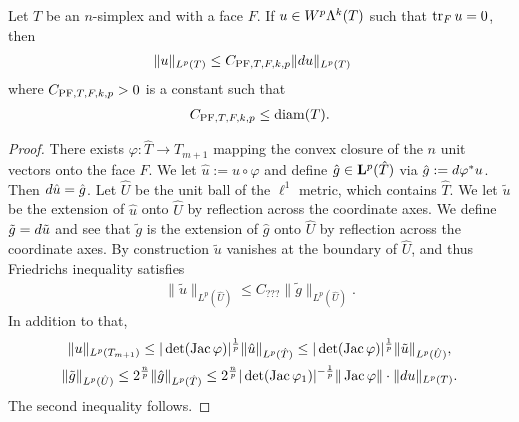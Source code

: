 \documentclass[12pt,a4paper]{article}
\begin{document}
\begin{lemma}\label{lemma:mixedbconsimplex:exteriorderivative}
    Let $T$ be an $n$-simplex and with a face $F$. 
    If $u \in W^{p}\Lambda^{k}(T)$ such that $\operatorname{tr}_{F} u = 0$, then 
    \begin{align*}
        \| u \|_{L^{p}(T)}
        &
        \leq 
        C_{{\rm PF},T,F,k,p} \| d u \|_{L^{p}(T)}
    \end{align*}
    where $C_{{\rm PF},T,F,k,p} > 0$ is a constant such that 
    \begin{align*}
        C_{{\rm PF},T,F,k,p}
        \leq 
        {\operatorname{diam}}(T)
        .
    \end{align*}
\end{lemma}
\begin{proof}
    There exists $\varphi : \hat T \rightarrow T_{m+1}$ mapping the convex closure of the $n$ unit vectors onto the face $F$.
    We let $\hat u := u \circ \varphi$ and define $\hat g \in {\mathbf L}^p(\hat T)$ via $\hat g := d \varphi^{\ast} u$. 
    Then $d \hat u = \hat g$. 
    Let $\hat U$ be the unit ball of the $\ell^1$ metric, which contains $\hat T$.
    We let $\tilde u$ be the extension of $\hat u$ onto $\hat U$ by reflection across the coordinate axes.
    We define $\tilde g = d \tilde u$
    and see that $\tilde g$ is the extension of $\hat g$ onto $\hat U$ by reflection across the coordinate axes. 
    By construction $\tilde u$ vanishes at the boundary of $\hat U$, and thus Friedrichs inequality satisfies 
    \begin{gather*}
        \| \tilde u \|_{L^{p}(\hat U)} 
        \leq 
        C_{???} 
        \| \tilde g \|_{L^{p}(\hat U)}
        .
    \end{gather*}
    In addition to that, 
    \begin{gather*}
        \| u \|_{L^{p}(T_{m+1})}
        \leq 
        |\det(\operatorname{{\rm Jac}} \varphi)|^{\frac 1 p} 
        \| \hat u \|_{L^{p}(\hat T)}
        \leq 
        |\det(\operatorname{{\rm Jac}} \varphi)|^{\frac 1 p} 
        \| \tilde u \|_{L^{p}(\hat U)}
        ,
        \\
        \| \tilde g \|_{L^{p}(\hat U)}
        \leq 
        2^{\frac n p}
        \| \hat g \|_{L^{p}(\hat T)}
        \leq 
        2^{\frac n p}
        |\det(\operatorname{{\rm Jac}} \varphi_1)|^{-\frac 1 p} \| \operatorname{{\rm Jac}} \varphi \| \cdot 
        \| d u \|_{L^{p}(T)}
        .
    \end{gather*}
    The second inequality follows.
\end{proof}
\end{document}
